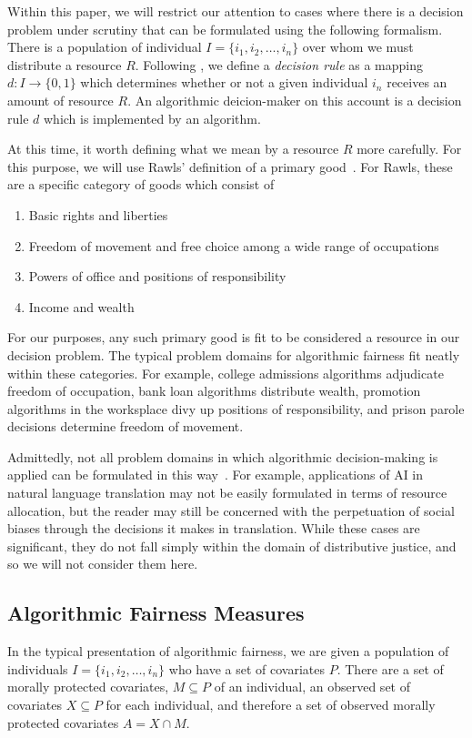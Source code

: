 Within this paper, we will restrict our attention to cases where there is a
decision problem under scrutiny that can be formulated using the following
formalism. There is a population of individual $I = \{i_1, i_2, \dots, i_n\}$
over whom we must distribute a resource $R$. Following \cite{Kuppler_2021}, we
define a \emph{decision rule} as a mapping $d: I \to \{0, 1\}$ which determines
whether or not a given individual $i_n$ receives an amount of resource $R$.
An algorithmic deicion-maker on this account is a decision rule $d$ which is
implemented by an algorithm.

At this time, it worth defining what we mean by a resource $R$ more carefully.
For this purpose, we will use Rawls' definition of a primary
good~\cite{Rawls_1971}. For Rawls, these are a specific category of goods which
consist of 
\begin{enumerate}
    \item Basic rights and liberties
    \item Freedom of movement and free choice among a wide range of occupations
    \item Powers of office and positions of responsibility
    \item Income and wealth
\end{enumerate}
For our purposes, any such primary good is fit to be considered a resource
in our decision problem. The typical problem domains for algorithmic
fairness fit neatly within these categories. For example, college admissions
algorithms adjudicate freedom of occupation, bank loan algorithms distribute
wealth, promotion algorithms in the worksplace divy up positions of
responsibility, and prison parole decisions determine freedom of movement.

Admittedly, not all problem domains in which algorithmic decision-making is
applied can be formulated in this way~\cite{Green_2017}. For example,
applications of AI in natural language translation may not be easily formulated
in terms of resource allocation, but the reader may still be concerned with the
perpetuation of social biases through the decisions it makes in translation.
While these cases are significant, they do not fall simply within the domain of
distributive justice, and so we will not consider them here.

\subsection{Algorithmic Fairness Measures}\label{sec:fairness-measures}
In the typical presentation of algorithmic fairness, we are given a population
of individuals $I = \{i_1, i_2, \ldots, i_n\}$ who have a set of covariates
$P$. There are a set of morally protected covariates, $M \subseteq P$ of an
individual, an observed set of covariates $X \subseteq P$ for each individual,
and therefore a set of observed morally protected covariates $A = X \cap M$.

